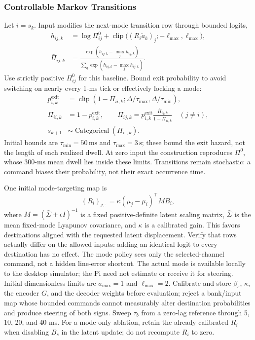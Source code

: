 \subsubsection{Controllable Markov Transitions}
Let $i=s_k$. Input modifies the next-mode transition row through bounded logits,
\begin{align}
 h_{ij,k}&=\log\Pi^0_{ij}
       +\operatorname{clip}\bigl((R_i\tilde a_k)_j;-\ell_{\max},\ell_{\max}\bigr),\\
 \bar\Pi_{ij,k}&=\frac{\exp(h_{ij,k}-\max_j h_{ij,k})}
                         {\sum_q\exp(h_{iq,k}-\max_j h_{ij,k})}.
 \label{eq:controlled-mode}
\end{align}
Use strictly positive $\Pi^0_{ij}$ for this baseline. Bound exit probability to avoid switching on nearly every 1-ms tick or effectively locking a mode:
\begin{align}
 p_{i,k}^{\mathrm{exit}}&=\operatorname{clip}
 \left(1-\bar\Pi_{ii,k};\Delta/\tau_{\max},\Delta/\tau_{\min}\right),\\
 \Pi_{ii,k}&=1-p_{i,k}^{\mathrm{exit}},\qquad
 \Pi_{ij,k}=p_{i,k}^{\mathrm{exit}}
       \frac{\bar\Pi_{ij,k}}{1-\bar\Pi_{ii,k}}\quad(j\ne i),\\
 s_{k+1}&\sim\operatorname{Categorical}(\Pi_{i:,k}).
 \label{eq:mode-exit}
\end{align}
Initial bounds are $\tau_{\min}=50\,\mathrm{ms}$ and $\tau_{\max}=3\,\mathrm{s}$; these bound the exit hazard, not the length of each realized dwell. At zero input the construction reproduces $\Pi^0$, whose 300-ms mean dwell lies inside these limits. Transitions remain stochastic: a command biases their probability, not their exact occurrence time.

One initial mode-targeting map is
\begin{equation}
 (R_i)_{j,:}=\kappa(\mu_j-\mu_i)^{\top}M B_i,
 \label{eq:mode-input-map}
\end{equation}
where $M=(\bar\Sigma+\epsilon I)^{-1}$ is a fixed positive-definite latent scaling matrix, $\bar\Sigma$ is the mean fixed-mode Lyapunov covariance, and $\kappa$ is a calibrated gain. This favors destinations aligned with the requested latent displacement. Verify that rows actually differ on the allowed inputs: adding an identical logit to every destination has no effect. The mode policy sees only the selected-channel command, not a hidden line-error shortcut. The actual mode is available locally to the desktop simulator; the Pi need not estimate or receive it for steering. Initial dimensionless limits are $a_{\max}=1$ and $\ell_{\max}=2$. Calibrate and store $\beta_s$, $\kappa$, the encoder $G$, and the decoder weights before evaluation; reject a bank/input map whose bounded commands cannot measurably alter destination probabilities and produce steering of both signs. Sweep $\tau_b$ from a zero-lag reference through 5, 10, 20, and 40 ms. For a mode-only ablation, retain the already calibrated $R_i$ when disabling $B_s$ in the latent update; do not recompute $R_i$ to zero.

